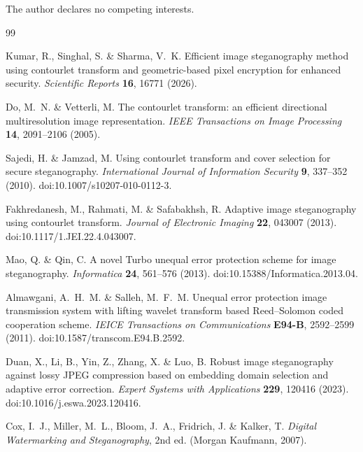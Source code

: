 The author declares no competing interests.

\begin{thebibliography}{99}

Kumar, R., Singhal, S. \& Sharma, V.~K.
Efficient image steganography method using contourlet transform and geometric-based pixel encryption for enhanced security.
\emph{Scientific Reports} \textbf{16}, 16771 (2026).

Do, M.~N. \& Vetterli, M.
The contourlet transform: an efficient directional multiresolution image representation.
\emph{IEEE Transactions on Image Processing} \textbf{14}, 2091--2106 (2005).

Sajedi, H. \& Jamzad, M.
Using contourlet transform and cover selection for secure steganography.
\emph{International Journal of Information Security} \textbf{9}, 337--352 (2010).
doi:10.1007/s10207-010-0112-3.

Fakhredanesh, M., Rahmati, M. \& Safabakhsh, R.
Adaptive image steganography using contourlet transform.
\emph{Journal of Electronic Imaging} \textbf{22}, 043007 (2013).
doi:10.1117/1.JEI.22.4.043007.

Mao, Q. \& Qin, C.
A novel Turbo unequal error protection scheme for image steganography.
\emph{Informatica} \textbf{24}, 561--576 (2013).
doi:10.15388/Informatica.2013.04.

Almawgani, A.~H.~M. \& Salleh, M.~F.~M.
Unequal error protection image transmission system with lifting wavelet transform based Reed--Solomon coded cooperation scheme.
\emph{IEICE Transactions on Communications} \textbf{E94-B}, 2592--2599 (2011).
doi:10.1587/transcom.E94.B.2592.

Duan, X., Li, B., Yin, Z., Zhang, X. \& Luo, B.
Robust image steganography against lossy JPEG compression based on embedding domain selection and adaptive error correction.
\emph{Expert Systems with Applications} \textbf{229}, 120416 (2023).
doi:10.1016/j.eswa.2023.120416.

Cox, I.~J., Miller, M.~L., Bloom, J.~A., Fridrich, J. \& Kalker, T.
\emph{Digital Watermarking and Steganography}, 2nd ed. (Morgan Kaufmann, 2007).


\end{thebibliography}
